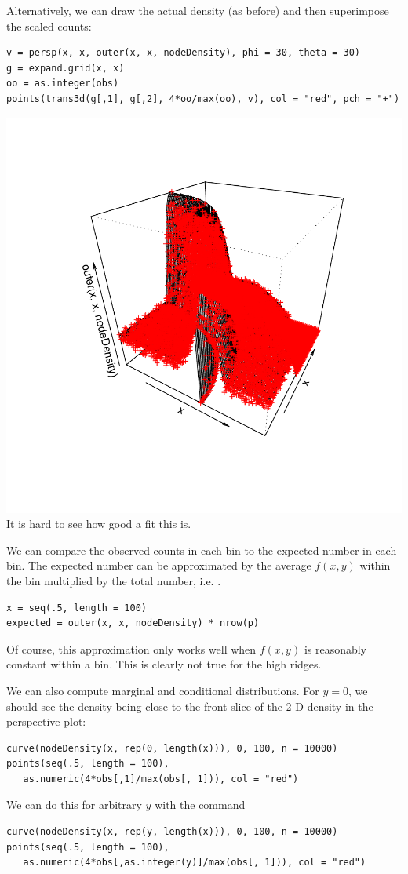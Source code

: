 Alternatively, we can draw the actual density
(as before) and then superimpose the scaled
counts:
{\footnotesize{
\begin{verbatim}
v = persp(x, x, outer(x, x, nodeDensity), phi = 30, theta = 30)
g = expand.grid(x, x)
oo = as.integer(obs)
points(trans3d(g[,1], g[,2], 4*oo/max(oo), v), col = "red", pch = "+")
\end{verbatim}
}}
\includegraphics{RNG/images/nodeDensityPoints.pdf}
It is hard to see how good a fit this is.


We can compare the observed counts in each bin to the expected number
in each bin.  The expected number can be approximated by the average
$f(x, y)$ within the bin multiplied by the total number, i.e.
.
\begin{verbatim}
x = seq(.5, length = 100)
expected = outer(x, x, nodeDensity) * nrow(p)
\end{verbatim}
Of course, this approximation only works well when 
$f(x,y)$ is reasonably constant within a bin.
This is clearly not true for the high ridges.


We can also compute marginal and conditional distributions.  For $y =
0$, we should see the density being close to the front slice of the 2-D
density in the perspective plot:
\begin{verbatim}
curve(nodeDensity(x, rep(0, length(x))), 0, 100, n = 10000)
points(seq(.5, length = 100), 
   as.numeric(4*obs[,1]/max(obs[, 1])), col = "red")
\end{verbatim}
We can do this for arbitrary $y$
with the command
\begin{verbatim}
curve(nodeDensity(x, rep(y, length(x))), 0, 100, n = 10000)
points(seq(.5, length = 100), 
   as.numeric(4*obs[,as.integer(y)]/max(obs[, 1])), col = "red")
\end{verbatim}


